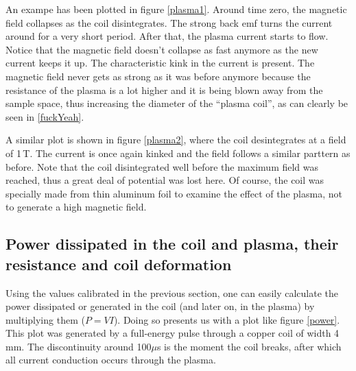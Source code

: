 An exampe has been plotted in figure \ref{plasma1}. Around time zero, the 
magnetic field collapses as the coil disintegrates. The strong back emf 
turns the current around for a very short period. After that, the plasma 
current starts to flow. Notice that the magnetic field doesn't collapse as fast 
anymore as the new current keeps it up. The characteristic kink in the current 
is present. The magnetic field never gets as strong as it was before anymore 
because the resistance of the plasma is a lot higher and it is being blown 
away from the sample space, thus increasing the diameter of the ``plasma 
coil'', as can clearly be seen in \ref{fuckYeah}.



A similar plot is shown in figure \ref{plasma2}, where the coil 
desintegrates at a field of 1\,T. The current is once again kinked and the 
field follows a similar parttern as before. Note that the coil 
disintegrated well before the maximum field was reached, thus a great deal 
of potential was lost here. Of course, the coil was specially made from 
thin aluminum foil to examine the effect of the plasma, not to generate a 
high magnetic field.



\subsection{Power dissipated in the coil and plasma, their resistance and coil 
deformation}

Using the values calibrated in the previous section, one can easily 
calculate the power dissipated or generated in the coil (and later on, in 
the plasma) by multiplying them ($P = VI$).  Doing so presents us with a 
plot like figure \ref{power}. This plot was generated by a full-energy 
pulse through a copper coil of width 4\,mm. The discontinuity around 
100$\mu$s is the moment the coil breaks, after which all current conduction 
occurs through the plasma.

